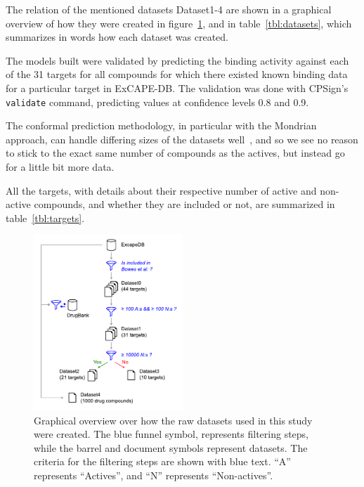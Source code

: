 \documentclass[utf8]{frontiersSCNS} %
\begin{document}
The relation of the mentioned datasets Dataset1-4 are shown in a graphical
overview of how they were created in figure~\ref{fig:datasets}, and in
table~\ref{tbl:datasets}, which summarizes in words how each dataset was
created.

The models built were validated by predicting the binding activity against each
of the 31 targets for all compounds for which there existed known binding data
for a particular target in ExCAPE-DB. The validation was done with CPSign's
\texttt{validate} command, predicting values at confidence levels 0.8 and 0.9.

The conformal prediction methodology, in particular with the Mondrian
approach, can handle differing sizes of the datasets
well~\cite{Norinder:2017qc}, and so we see no reason to stick to the exact
same number of compounds as the actives, but instead go for a little bit more
data.

%
All the targets, with details about their respective number of active and
non-active compounds, and whether they are included or not, are summarized in
table~\ref{tbl:targets}.

\begin{figure}[t]
\begin{center}
\includegraphics[width=0.5\textwidth]{figures/datasets/datasets.pdf}
    \caption{Graphical overview over how the raw datasets used in this study
    were created. The blue funnel symbol, represents filtering steps, while
    the barrel and document symbols represent datasets. The criteria for the
    filtering steps are shown with blue text. ``A'' represents ``Actives'',
    and ``N'' represents ``Non-actives''.}
    \label{fig:datasets}
\end{center}
\end{figure}
\end{document}
